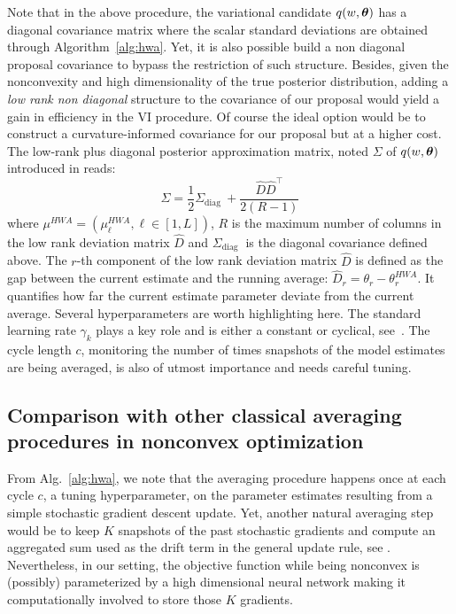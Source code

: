 \documentclass[tablecaption=bottom,wcp]{jmlr}
\begin{document}
Note that in the above procedure, the variational candidate $q(w, \param)$ has a diagonal covariance matrix where the scalar standard deviations are obtained through Algorithm~\ref{alg:hwa}.
Yet, it is also possible build a non diagonal proposal covariance to bypass the restriction of such structure.
Besides, given the nonconvexity and high dimensionality of the true posterior distribution, adding a \emph{low rank non diagonal} structure to the covariance of our proposal would yield a gain in efficiency in the VI procedure.
Of course the ideal option would be to construct a curvature-informed covariance for our proposal but at a higher cost.
The low-rank plus diagonal posterior approximation matrix, noted $\Sigma$ of $q(w, \param)$ introduced in \citep{maddox2019simple} reads:
\begin{equation}\label{eq:lowrankcov}
\Sigma = \frac{1}{2} \Sigma_{\text {diag }}+\frac{\widehat{D} \widehat{D}^{\top}}{2(R-1)}
\end{equation}
where $\mu^{HWA} = (\mu_{\ell}^{HWA}, \ell \in [1,L])$, $R$ is the maximum number of columns in the low rank deviation matrix $\widehat{D}$ and $\Sigma_{\text {diag }}$ is the diagonal covariance defined above. 
The $r$-th component of the  low rank deviation matrix $\widehat{D}$ is defined as the gap between the current estimate and the running average: $\widehat{D}_r = \theta_r - \theta^{HWA}_r$. 
It quantifies how far the current estimate parameter deviate from the current average.
Several hyperparameters are worth highlighting here.
The standard learning rate $\gamma_k$ plays a key role and is either a constant or cyclical, see~\citep{zhang2019cyclical}.
The cycle length $c$, monitoring the number of times snapshots of the model estimates are being averaged, is also of utmost importance and needs careful tuning.


\subsection{Comparison with other classical averaging procedures in nonconvex optimization}
From Alg.~\ref{alg:hwa}, we note that the averaging procedure happens once at each cycle $c$, a tuning hyperparameter, on the parameter estimates resulting from a simple stochastic gradient descent update.
Yet, another natural averaging step would be to keep $K$ snapshots of the past stochastic gradients and compute an aggregated sum used as the drift term in the general update rule, see \citep{zhou2017convergence}.
Nevertheless, in our setting, the objective function while being nonconvex is (possibly) parameterized by a high dimensional neural network making it computationally involved to store those $K$ gradients.
\end{document}
